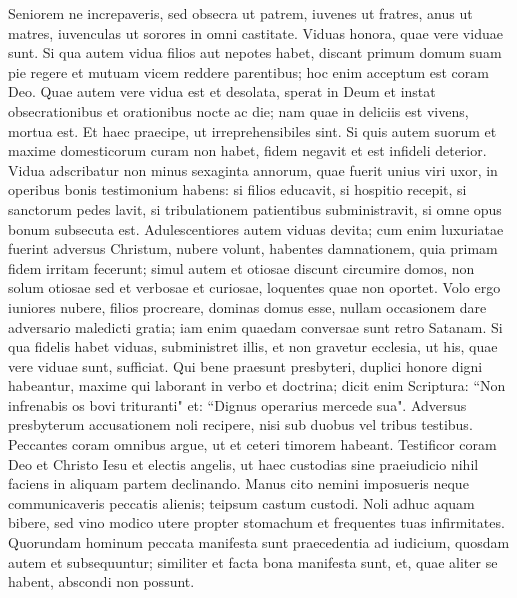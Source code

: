 \begin{biblechapter} 
\verse Seniorem ne increpaveris, sed obsecra ut patrem, iuvenes ut fratres, 
\verse anus ut matres, iuvenculas ut sorores in omni castitate. 
\verse Viduas honora, quae vere viduae sunt. 
\verse Si qua autem vidua filios aut nepotes habet, discant primum domum suam pie regere et mutuam vicem reddere parentibus; hoc enim acceptum est coram Deo. 
\verse Quae autem vere vidua est et desolata, sperat in Deum et instat obsecrationibus et orationibus nocte ac die; 
\verse nam quae in deliciis est vivens, mortua est. 
\verse Et haec praecipe, ut irreprehensibiles sint. 
\verse Si quis autem suorum et maxime domesticorum curam non habet, fidem negavit et est infideli deterior. 
\verse Vidua adscribatur non minus sexaginta annorum, quae fuerit unius viri uxor, 
\verse in operibus bonis testimonium habens: si filios educavit, si hospitio recepit, si sanctorum pedes lavit, si tribulationem patientibus subministravit, si omne opus bonum subsecuta est. 
\verse Adulescentiores autem viduas devita; cum enim luxuriatae fuerint adversus Christum, nubere volunt, 
\verse habentes damnationem, quia primam fidem irritam fecerunt; 
\verse simul autem et otiosae discunt circumire domos, non solum otiosae sed et verbosae et curiosae, loquentes quae non oportet. 
\verse Volo ergo iuniores nubere, filios procreare, dominas domus esse, nullam occasionem dare adversario maledicti gratia; 
\verse iam enim quaedam conversae sunt retro Satanam. 
\verse Si qua fidelis habet viduas, subministret illis, et non gravetur ecclesia, ut his, quae vere viduae sunt, sufficiat. 
\verse Qui bene praesunt presbyteri, duplici honore digni habeantur, maxime qui laborant in verbo et doctrina; 
\verse dicit enim Scriptura: “Non infrenabis os bovi trituranti" et: “Dignus operarius mercede sua". 
\verse Adversus presbyterum accusationem noli recipere, nisi sub duobus vel tribus testibus. 
\verse Peccantes coram omnibus argue, ut et ceteri timorem habeant. 
\verse Testificor coram Deo et Christo Iesu et electis angelis, ut haec custodias sine praeiudicio nihil faciens in aliquam partem declinando. 
\verse Manus cito nemini imposueris neque communicaveris peccatis alienis; teipsum castum custodi. 
\verse Noli adhuc aquam bibere, sed vino modico utere propter stomachum et frequentes tuas infirmitates. 
\verse Quorundam hominum peccata manifesta sunt praecedentia ad iudicium, quosdam autem et subsequuntur; 
\verse similiter et facta bona manifesta sunt, et, quae aliter se habent, abscondi non possunt. 
\end{biblechapter}

